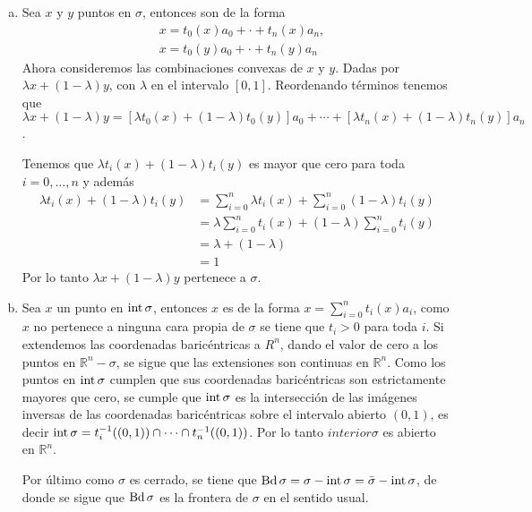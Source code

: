 \begin{Dem}
\begin{enumerate}[(a)]
\item Sea $x$ y $y$ puntos en $\sigma$, entonces son de la forma
\begin{align*}
&x = t_0(x)a_0+\cdot +t_n(x)a_n ,\\
&x = t_0(y)a_0+\cdot +t_n(y)a_n
\end{align*}
Ahora consideremos las combinaciones convexas de $x$ y $y$. Dadas por 
$\lambda x + (1-\lambda)y$, con $\lambda$ en el intervalo $[0,1]$. 
Reordenando términos tenemos que
$\lambda x + (1-\lambda)y = [\lambda t_0(x)+(1-\lambda)t_0(y)]a_0+\cdots + [\lambda t_n(x)+(1-\lambda)t_n(y)]a_n$. 

Tenemos que $\lambda t_i(x)+(1-\lambda)t_i(y)$ es mayor que cero para toda $i = 0,\ldots ,n$ y además
\begin{align*}
\lambda t_i(x)+(1-\lambda)t_i(y)&=  \sum_{i=0}^{n}\lambda t_i(x)+\sum_{i=0}^{n}(1-\lambda)t_i(y) \\
&= \lambda\sum_{i=0}^{n}t_i(x)+(1-\lambda)\sum_{i=0}^{n}t_i(y)\\ 
&= \lambda + (1-\lambda)\\
& = 1
\end{align*}
Por lo tanto $\lambda x + (1-\lambda)y$ pertenece a $\sigma$.

\item Sea $x$ un punto en $\operatorname{int} \sigma$, entonces $x$ es de la forma $x = \sum_{i=0}^{n} t_i(x)a_i$, como $x$ no pertenece a ninguna cara propia de $\sigma$ se tiene que $t_i>0$ para toda $i$.
Si extendemos las coordenadas baricéntricas a $R^n$, dando el valor de cero a los puntos en $\mathbb{R}^n-\sigma$, se sigue que las extensiones son continuas en $\mathbb{R}^n$.
Como los puntos en $\operatorname{int} \sigma$ cumplen que sus coordenadas baricéntricas son estrictamente mayores que cero, se cumple que $\operatorname{int} \sigma$ es la intersección de las imágenes inversas de las coordenadas baricéntricas sobre el intervalo abierto $(0,1)$, es decir $\operatorname{int} \sigma = t_i^{-1}((0,1))\cap\cdots\cap t_n^{-1}((0,1))$. Por lo tanto $interior \sigma$ es abierto en $\mathbb{R}^n$. 

Por último como $\sigma$ es cerrado, se tiene que $\operatorname{Bd} \sigma = \sigma -\operatorname{int} \sigma = \bar{\sigma}-\operatorname{int} \sigma$, de donde se sigue que $\operatorname{Bd} \sigma$ es la frontera de $\sigma$ en el sentido usual.
\end{enumerate}
\end{Dem}

